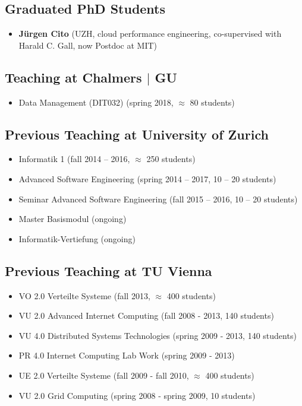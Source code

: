 \documentclass[paper=letter,fontsize=11pt]{scrartcl} %
\begin{document}
\subsection*{Graduated PhD Students}

\begin{itemize}
\item \textbf{J\"urgen Cito} (UZH, cloud performance engineering, co-supervised with Harald C. Gall, now Postdoc at MIT)
\end{itemize}

\subsection*{Teaching at Chalmers $|$ GU}
\begin{itemize}
  \item Data Management (DIT032) (spring 2018, $\approx$ 80 students)
\end{itemize}

\subsection*{Previous Teaching at University of Zurich}
\begin{itemize}
  \item Informatik 1 (fall 2014 -- 2016, $\approx$ 250 students)
  \item Advanced Software Engineering (spring 2014 -- 2017, 10 -- 20 students)
  \item Seminar Advanced Software Engineering (fall 2015 -- 2016, 10 -- 20 students)
  \item Master Basismodul (ongoing)
  \item Informatik-Vertiefung (ongoing)
\end{itemize}

\subsection*{Previous Teaching at TU Vienna}
\begin{itemize}
  \item VO 2.0 Verteilte Systeme (fall 2013, $\approx$ 400  students)
  \item VU 2.0 Advanced Internet Computing (fall 2008 - 2013, 140 students)
  \item VU 4.0 Distributed Systems Technologies (spring 2009 - 2013, 140 students)
  \item PR 4.0 Internet Computing Lab Work (spring 2009 - 2013)
  \item UE 2.0 Verteilte Systeme (fall 2009 - fall 2010, $\approx$ 400 students)
  \item VU 2.0 Grid Computing (spring 2008 - spring 2009, 10 students)
\end{itemize}
\end{document}

